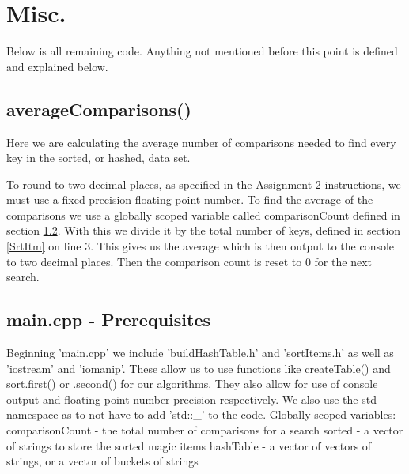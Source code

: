 \documentclass[12pt, letterpaper]{article}
\begin{document}
\section{Misc.} \label{Misc}
Below is all remaining code.
Anything not mentioned before this point is defined and explained below.
\subsection{averageComparisons()} \label{AvgComp}
Here we are calculating the average number of comparisons needed to find every key in the sorted, or hashed, data set.

To round to two decimal places, as specified in the Assignment 2 instructions, we must use a fixed precision floating point number.
To find the average of the comparisons we use a globally scoped variable called comparisonCount defined in section \ref{Prereq}.
With this we divide it by the total number of keys, defined in section \ref{SrtItm} on line 3.
This gives us the average which is then output to the console to two decimal places.
Then the comparison count is reset to 0 for the next search.

\subsection{main.cpp - Prerequisites} \label{Prereq}

Beginning 'main.cpp' we include 'buildHashTable.h' and 'sortItems.h' as well as 'iostream' and 'iomanip'.
These allow us to use functions like createTable() and sort.first() or .second() for our algorithms.
They also allow for use of console output and floating point number precision respectively. 
We also use the std namespace as to not have to add 'std::\_' to the code.
\newline
\newline
Globally scoped variables:
\newline
\indent comparisonCount - the total number of comparisons for a search
\newline
\indent sorted - a vector of strings to store the sorted magic items
\newline
\indent hashTable - a vector of vectors of strings, or a vector of buckets of strings
\end{document}
